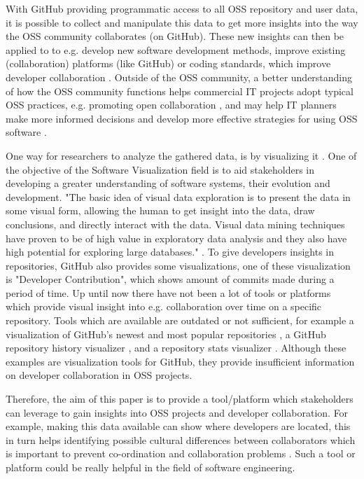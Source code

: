 \documentclass[acmtog, authorversion]{acmart}
\begin{document}
With GitHub providing programmatic access to all OSS repository and user data\cite{GHAPI}, it is possible to collect and manipulate this data to get more insights into the way the OSS community collaborates (on GitHub).
These new insights can then be applied to to e.g. develop new software development methods, improve existing (collaboration) platforms (like GitHub) or coding standards, which improve developer collaboration \cite{Jermakovics2013}.
Outside of the OSS community, a better understanding of how the OSS community functions helps commercial IT projects adopt typical OSS practices, e.g. promoting open collaboration \cite{Kalliamvakou:2015:OSC:2818754.2818825}, and may help IT planners make more informed decisions and develop more effective strategies for using OSS software \cite{madey2002}. 

One way for researchers to analyze the gathered data, is by visualizing it \cite{Heller}.
One of the objective of the Software Visualization field is to aid stakeholders in developing a greater understanding of software systems, their evolution and development.
"The basic idea of visual data exploration is to present the data in some visual form, allowing the human to get insight into the data, draw conclusions, and directly interact with the data. 
Visual data mining techniques have proven to be of high value in exploratory data analysis and they also have high potential for exploring large databases." \cite{981847}.
To give developers insights in repositories, GitHub also provides some visualizations, one of these visualization is "Developer Contribution", which shows amount of commits made during a period of time.
Up until now there have not been a lot of tools or platforms which provide visual insight into e.g. collaboration over time on a specific repository.
Tools which are available are outdated \cite{Heller} or not sufficient, for example a visualization of GitHub's newest and most popular repositories \cite{donnemartin2016}, a GitHub repository history visualizer \cite{artzub2013}, and a repository stats visualizer \cite{bajaj2013}.
Although these examples are visualization tools for GitHub, they provide insufficient information on developer collaboration in OSS projects.

Therefore, the aim of this paper is to provide a tool/platform which stakeholders can leverage to gain insights into OSS projects and developer collaboration.
For example, making this data available can show where developers are located, this in turn helps identifying possible cultural differences between collaborators which is important to prevent co-ordination and collaboration problems \cite{Mishra2014}.
Such a tool or platform could be really helpful in the field of software engineering.
\end{document}
